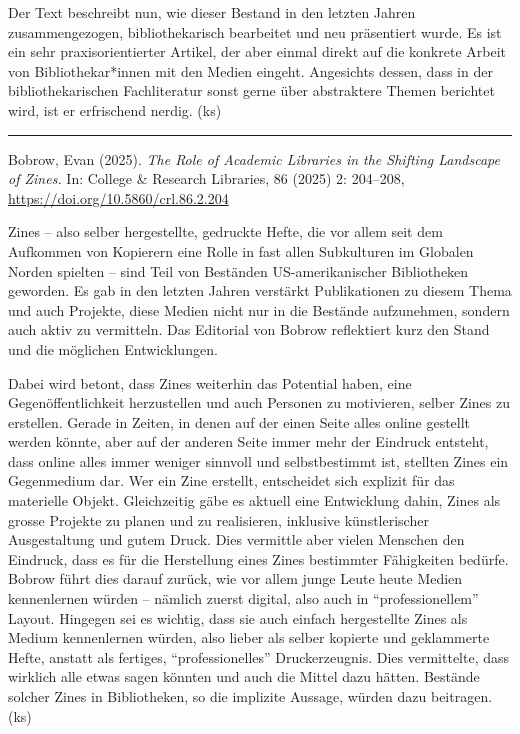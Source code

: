 \documentclass[a4paper,
fontsize=11pt,
oneside,
numbers=noperiodatend,
parskip=half-,
bibliography=totoc,
final
]{scrartcl}
\begin{document}
Der Text beschreibt nun, wie dieser Bestand in den letzten Jahren
zusammengezogen, bibliothekarisch bearbeitet und neu präsentiert wurde.
Es ist ein sehr praxisorientierter Artikel, der aber einmal direkt auf
die konkrete Arbeit von Bibliothekar*innen mit den Medien eingeht.
Angesichts dessen, dass in der bibliothekarischen Fachliteratur sonst
gerne über abstraktere Themen berichtet wird, ist er erfrischend nerdig.
(ks)

\begin{center}\rule{0.5\linewidth}{0.5pt}\end{center}

Bobrow, Evan (2025). \emph{The Role of Academic Libraries in the
Shifting Landscape of Zines.} In: College \& Research Libraries, 86
(2025) 2: 204--208, \url{https://doi.org/10.5860/crl.86.2.204}

Zines -- also selber hergestellte, gedruckte Hefte, die vor allem seit
dem Aufkommen von Kopierern eine Rolle in fast allen Subkulturen im
Globalen Norden spielten -- sind Teil von Beständen US-amerikanischer
Bibliotheken geworden. Es gab in den letzten Jahren verstärkt
Publikationen zu diesem Thema und auch Projekte, diese Medien nicht nur
in die Bestände aufzunehmen, sondern auch aktiv zu vermitteln. Das
Editorial von Bobrow reflektiert kurz den Stand und die möglichen
Entwicklungen.

Dabei wird betont, dass Zines weiterhin das Potential haben, eine
Gegenöffentlichkeit herzustellen und auch Personen zu motivieren, selber
Zines zu erstellen. Gerade in Zeiten, in denen auf der einen Seite alles
online gestellt werden könnte, aber auf der anderen Seite immer mehr der
Eindruck entsteht, dass online alles immer weniger sinnvoll und
selbstbestimmt ist, stellten Zines ein Gegenmedium dar. Wer ein Zine
erstellt, entscheidet sich explizit für das materielle Objekt.
Gleichzeitig gäbe es aktuell eine Entwicklung dahin, Zines als grosse
Projekte zu planen und zu realisieren, inklusive künstlerischer
Ausgestaltung und gutem Druck. Dies vermittle aber vielen Menschen den
Eindruck, dass es für die Herstellung eines Zines bestimmter Fähigkeiten
bedürfe. Bobrow führt dies darauf zurück, wie vor allem junge Leute
heute Medien kennenlernen würden -- nämlich zuerst digital, also auch in
\enquote{professionellem} Layout. Hingegen sei es wichtig, dass sie auch
einfach hergestellte Zines als Medium kennenlernen würden, also lieber
als selber kopierte und geklammerte Hefte, anstatt als fertiges,
\enquote{professionelles} Druckerzeugnis. Dies vermittelte, dass
wirklich alle etwas sagen könnten und auch die Mittel dazu hätten.
Bestände solcher Zines in Bibliotheken, so die implizite Aussage, würden
dazu beitragen. (ks)
\end{document}
